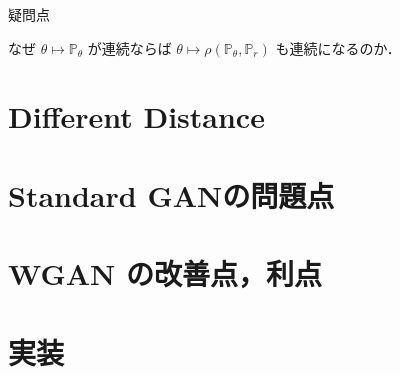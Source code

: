 \documentclass[uplatex, dvipdfmx]{jsarticle}
\theoremstyle{definition}
\begin{document}
\begin{itembox}[l]{疑問点}
\begin{enumerate}
            なぜ $\theta \longmapsto \mathbb{P}_{\theta}$ が連続ならば $\theta \longmapsto \rho (\mathbb{P}_{\theta}, \mathbb{P}_{r})$ も連続になるのか．

        \end{enumerate}
        
    \end{itembox}

    \section{Different Distance}

    \section{Standard GANの問題点}

    \section{WGAN の改善点，利点}

    \section{実装}
\end{document}

